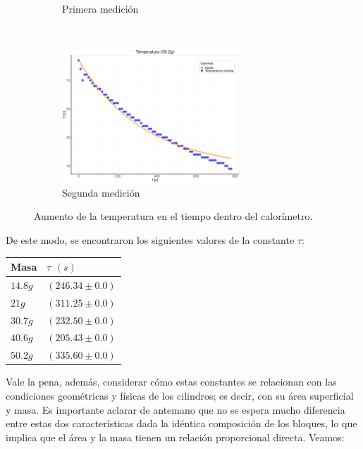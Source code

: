 \documentclass{article}
\begin{document}
\begin{figure}[H]
\begin{subfigure}[t]{0.5\textwidth}
        \caption{Primera medición}
    \end{subfigure}%
    ~ 
    \begin{subfigure}[t]{0.5\textwidth}
        \centering
        \includegraphics[height=5cm]{media/Tvt_5.png}
        \caption{Segunda medición}
    \end{subfigure}
    \caption{Aumento de la temperatura en el tiempo dentro del calorímetro.}
    \label{fig:electemp}
\end{figure}

De este modo, se encontraron los siguientes valores de la constante $\tau$:

\begin{table}[H]
    \centering
    \begin{tabular}{l|l}
    Masa     & $\tau$ $(s)$       \\
    \hline
    $14.8g$  & $(246.34 \pm 0.0)$ \\
    $21g$    & $(311.25 \pm 0.0)$ \\
    $30.7g$  & $(232.50 \pm 0.0)$ \\
    $40.6g$  & $(205.43 \pm 0.0)$ \\
    $50.2g$  & $(335.60 \pm 0.0)$ \\
    \end{tabular}
    \end{table}

Vale la pena, además, considerar cómo estas constantes se relacionan con las condiciones geométricas y físicas de los cilindros; es decir, con su área superficial y masa. Es importante aclarar de antemano que no se espera mucho diferencia entre estas dos características dada la idéntica composición de los bloques, lo que implica que el área y la masa tienen un relación proporcional directa. Veamos:
\end{document}
